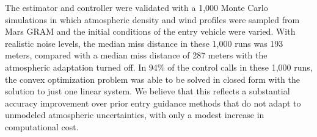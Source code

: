 The estimator and controller were validated with a 1,000 Monte Carlo simulations in which atmospheric density and wind profiles were sampled from Mars GRAM and the initial conditions of the entry vehicle were varied. With realistic noise levels, the median miss distance in these 1,000 runs was 193 meters, compared with a median miss distance of 287 meters with the atmospheric adaptation turned off. In 94\% of the control calls in these 1,000 runs, the convex optimization problem was able to be solved in closed form with the solution to just one linear system. We believe that this reflects a substantial accuracy improvement over prior entry guidance methods that do not adapt to unmodeled atmospheric uncertainties, with only a modest increase in computational cost.

